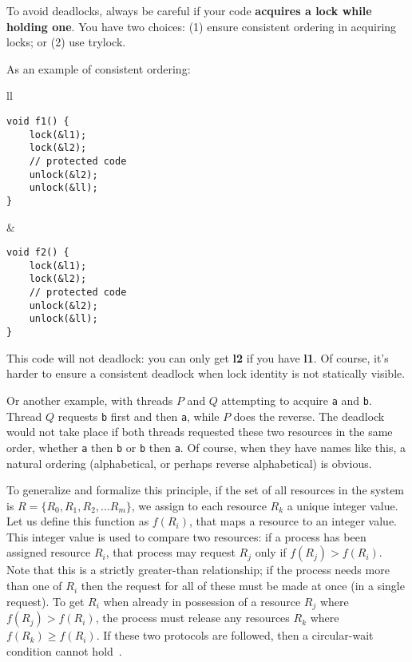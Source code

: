 To avoid deadlocks, always be careful if your code {\bf acquires a
  lock while holding one}.  You have two choices: (1) ensure
consistent ordering in acquiring locks; or (2) use trylock.

As an example of consistent ordering:
\begin{center}
\begin{tabular}{ll}
\begin{minipage}{.4\textwidth}
  \begin{verbatim}
void f1() {
    lock(&l1);
    lock(&l2);
    // protected code
    unlock(&l2);
    unlock(&ll);    
}
\end{verbatim}
\end{minipage}&
\begin{minipage}{.4\textwidth}
\begin{verbatim}
void f2() {
    lock(&l1);
    lock(&l2);
    // protected code
    unlock(&l2);
    unlock(&ll);    
}
  \end{verbatim}
\end{minipage}
\end{tabular}
\end{center}
This code will not deadlock: you can only get {\bf l2} if you have
{\bf l1}. Of course, it's harder to ensure a consistent deadlock when lock
identity is not statically visible.

Or another example, with threads $P$ and $Q$ attempting to acquire \texttt{a} and \texttt{b}. Thread $Q$ requests \texttt{b} first and then \texttt{a}, while $P$ does the reverse. The deadlock would not take place if both threads requested these two resources in the same order, whether \texttt{a} then \texttt{b} or \texttt{b} then \texttt{a}. Of course, when they have names like this, a natural ordering (alphabetical, or perhaps reverse alphabetical) is obvious. 

To generalize and formalize this principle, if the set of all resources in the system is $R = \{R_{0}, R_{1}, R_{2}, ... R_{m}\}$, we assign to each resource $R_{k}$ a unique integer value. Let us define this function as $f(R_{i})$, that maps a resource to an integer value. This integer value is used to compare two resources: if a process has been assigned resource $R_{i}$, that process may request $R_{j}$ only if $f(R_{j}) > f(R_{i})$. Note that this is a strictly greater-than relationship; if the process needs more than one of $R_{i}$ then the request for all of these must be made at once (in a single request). To get $R_{i}$ when already in possession of a resource $R_{j}$ where $f(R_{j}) > f(R_{i})$, the process must release any resources $R_{k}$ where $f(R_{k}) \geq f(R_{i})$. If these two protocols are followed, then a circular-wait condition cannot hold~\cite{osc}.


